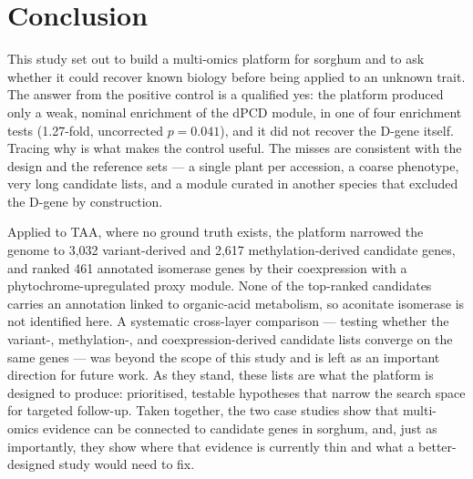 \section{Conclusion}
\hspace{1em}This study set out to build a multi-omics platform for sorghum and to ask whether it could recover known biology before being applied to an unknown trait. The answer from the positive control is a qualified yes: the platform produced only a weak, nominal enrichment of the dPCD module, in one of four enrichment tests (1.27-fold, uncorrected $p = 0.041$), and it did not recover the D-gene itself. Tracing why is what makes the control useful. The misses are consistent with the design and the reference sets --- a single plant per accession, a coarse phenotype, very long candidate lists, and a module curated in another species that excluded the D-gene by construction.

\hspace{1em}Applied to TAA, where no ground truth exists, the platform narrowed the genome to 3,032 variant-derived and 2,617 methylation-derived candidate genes, and ranked 461 annotated isomerase genes by their coexpression with a phytochrome-upregulated proxy module. None of the top-ranked candidates carries an annotation linked to organic-acid metabolism, so aconitate isomerase is not identified here. A systematic cross-layer comparison --- testing whether the variant-, methylation-, and coexpression-derived candidate lists converge on the same genes --- was beyond the scope of this study and is left as an important direction for future work. As they stand, these lists are what the platform is designed to produce: prioritised, testable hypotheses that narrow the search space for targeted follow-up. Taken together, the two case studies show that multi-omics evidence can be connected to candidate genes in sorghum, and, just as importantly, they show where that evidence is currently thin and what a better-designed study would need to fix.


